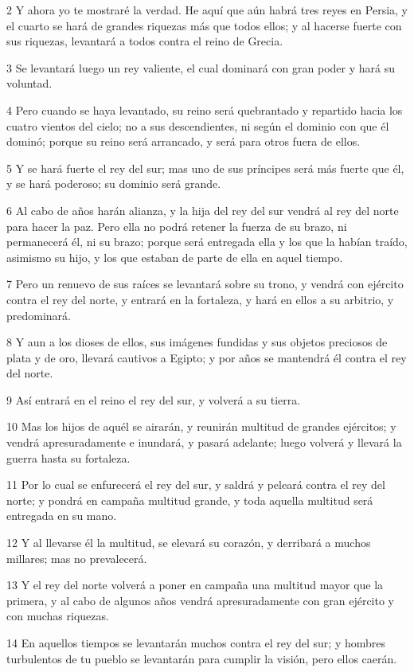 \par 2 Y ahora yo te mostraré la verdad. He aquí que aún habrá tres reyes en Persia, y el cuarto se hará de grandes riquezas más que todos ellos; y al hacerse fuerte con sus riquezas, levantará a todos contra el reino de Grecia.
\par 3 Se levantará luego un rey valiente, el cual dominará con gran poder y hará su voluntad.
\par 4 Pero cuando se haya levantado, su reino será quebrantado y repartido hacia los cuatro vientos del cielo; no a sus descendientes, ni según el dominio con que él dominó; porque su reino será arrancado, y será para otros fuera de ellos.
\par 5 Y se hará fuerte el rey del sur; mas uno de sus príncipes será más fuerte que él, y se hará poderoso; su dominio será grande.
\par 6 Al cabo de años harán alianza, y la hija del rey del sur vendrá al rey del norte para hacer la paz. Pero ella no podrá retener la fuerza de su brazo, ni permanecerá él, ni su brazo; porque será entregada ella y los que la habían traído, asimismo su hijo, y los que estaban de parte de ella en aquel tiempo.
\par 7 Pero un renuevo de sus raíces se levantará sobre su trono, y vendrá con ejército contra el rey del norte, y entrará en la fortaleza, y hará en ellos a su arbitrio, y predominará.
\par 8 Y aun a los dioses de ellos, sus imágenes fundidas y sus objetos preciosos de plata y de oro, llevará cautivos a Egipto; y por años se mantendrá él contra el rey del norte.
\par 9 Así entrará en el reino el rey del sur, y volverá a su tierra.
\par 10 Mas los hijos de aquél se airarán, y reunirán multitud de grandes ejércitos; y vendrá apresuradamente e inundará, y pasará adelante; luego volverá y llevará la guerra hasta su fortaleza.
\par 11 Por lo cual se enfurecerá el rey del sur, y saldrá y peleará contra el rey del norte; y pondrá en campaña multitud grande, y toda aquella multitud será entregada en su mano.
\par 12 Y al llevarse él la multitud, se elevará su corazón, y derribará a muchos millares; mas no prevalecerá.
\par 13 Y el rey del norte volverá a poner en campaña una multitud mayor que la primera, y al cabo de algunos años vendrá apresuradamente con gran ejército y con muchas riquezas.
\par 14 En aquellos tiempos se levantarán muchos contra el rey del sur; y hombres turbulentos de tu pueblo se levantarán para cumplir la visión, pero ellos caerán.
